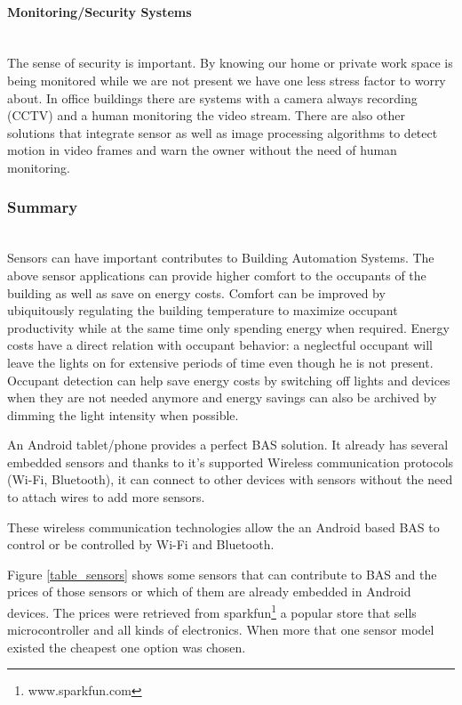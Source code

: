 \paragraph{Monitoring/Security Systems}\mbox{}\\

The sense of security is important. By knowing our home or private work space is being monitored while we are not present we have one less stress factor to worry about.
In office buildings there are systems with a camera always recording (CCTV)\cite{livro_automation2} and a human monitoring the video stream. There are also other solutions that integrate sensor as well as image processing algorithms\cite{video_survailance1} to detect motion in video frames and warn the owner without the need of human monitoring. 




\subsubsection{Summary}\mbox{}\\

Sensors can have important contributes to Building Automation Systems. The above sensor applications can provide higher comfort to the occupants of the building as well as save on energy costs. Comfort can be improved by ubiquitously regulating the building temperature to maximize occupant productivity while at the same time only spending energy when required. Energy costs have a direct relation with occupant behavior: a neglectful occupant will leave the lights on for extensive periods of time even though he is not present. Occupant detection can help save energy costs by switching off lights and devices when they are not needed anymore and energy savings can also be archived by dimming the light intensity when possible. 

An Android tablet/phone provides a perfect BAS solution. It already has several embedded sensors  and thanks to it's supported Wireless communication protocols (Wi-Fi, Bluetooth), it can connect to other devices with sensors without the need to attach wires to add more sensors. 

These wireless communication technologies allow the an Android based BAS to control or be controlled by Wi-Fi and Bluetooth.

Figure \ref{table_sensors} shows some sensors that can contribute to BAS and the prices of those sensors or which of them are already embedded in Android devices. The prices were retrieved from sparkfun\footnote{www.sparkfun.com} a popular store that sells microcontroller and all kinds of electronics. When more that one sensor model existed the cheapest one option was chosen.

